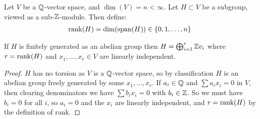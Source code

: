 \documentclass[10pt,a4paper]{article}
\begin{document}
Let $V$ be a $\mathbb{Q}$-vector space, and $\dim(V) = n < \infty$. Let $H \subset V$ be a subgroup, viewed as a sub-$\mathbb{Z}$-module. Then define:
\begin{align*}
\operatorname{rank}(H) = \dim(\operatorname{span}(H)) \in \{0, 1, \ldots, n\}
\end{align*}
\begin{proposition}
If $H$ is finitely generated as an abelian group then $H = \bigoplus_{i=1}^r \mathbb{Z} v_i$ where $r = \operatorname{rank}(H)$ and $x_1, \ldots, x_r \in V$ are linearly independent.
\end{proposition}
\begin{proof}
$H$ has no torsion as $V$ is a $\mathbb{Q}$-vector space, so by classification $H$ is an abelian group freely generated by some $x_1, \ldots, x_r$. If $a_i \in \mathbb{Q}$ and $\sum a_i x_i = 0$ in $V$, then clearing denominators we have $\sum b_i x_i = 0$ with $b_i \in \mathbb{Z}$. So we must have $b_i = 0$ for all $i$, so $a_i = 0$ and the $x_i$ are linearly independent, and $r = \operatorname{rank}(H)$ by the definition of rank.
\end{proof}
\end{document}
